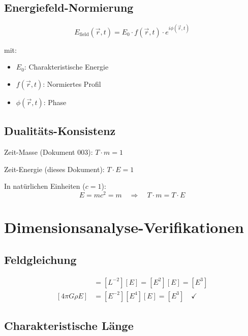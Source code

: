 	\subsection{Energiefeld-Normierung}
	
	\begin{equation}
		E_{\text{field}}(\vec{r}, t) = E_0 \cdot f(\vec{r}, t) \cdot e^{i\phi(\vec{r}, t)}
	\end{equation}
	
	mit:
	\begin{itemize}
		\item $E_0$: Charakteristische Energie
		\item $f(\vec{r}, t)$: Normiertes Profil
		\item $\phi(\vec{r}, t)$: Phase
	\end{itemize}
	
	\subsection{Dualitäts-Konsistenz}
	
	Zeit-Masse (Dokument 003): $T \cdot m = 1$
	
	Zeit-Energie (dieses Dokument): $T \cdot E = 1$
	
	In natürlichen Einheiten ($c = 1$):
	\begin{equation}
		E = mc^2 = m \quad \Rightarrow \quad T \cdot m = T \cdot E
	\end{equation}
	
	\section{Dimensionsanalyse-Verifikationen}
	\label{sec:dimensional_analysis}
	
	\subsection{Feldgleichung}
	
	\begin{align}
		[\nabla^2 E] &= [L^{-2}][E] = [E^2][E] = [E^3] \\
		[4\pi G \rho E] &= [E^{-2}][E^4][E] = [E^3] \quad \checkmark
	\end{align}
	
	\subsection{Charakteristische Länge}
	
